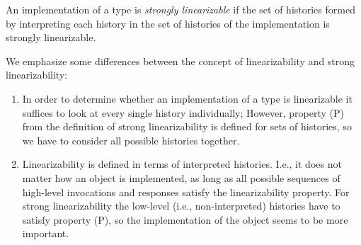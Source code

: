\documentclass[11pt,letterpaper]{article}
\begin{document}
An implementation of a type is \emph{strongly linearizable} if the set of histories formed by
interpreting each history in the set of histories of the implementation is strongly linearizable.

We emphasize some differences between the concept of linearizability and strong linearizability:
\begin{enumerate}
 \item In order to determine whether an implementation of a type is linearizable it suffices to look at every single history individually; However, property (P) from the definition of strong linearizability is defined for sets of histories, so we have to consider all possible histories together.
 \item Linearizability is defined in terms of interpreted histories. I.e., it does not matter how an object is implemented, as long as all possible sequences of high-level invocations and responses satisfy the linearizability property.
 For strong linearizability the low-level (i.e., non-interpreted) histories have to satisfy property (P), so the implementation of the object seems to be more important.
\end{enumerate}
\end{document}
